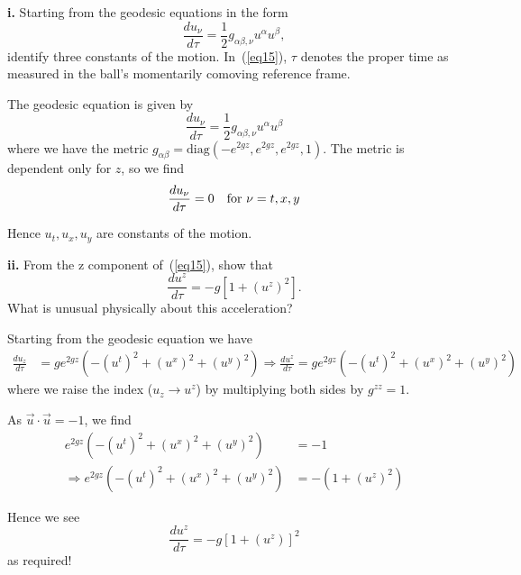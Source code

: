 \documentclass[a4paper]{article} %
\newcommand{\diag}{\text{diag}}
\begin{document}
\begin{framed}
\textbf{i.} Starting from the geodesic equations in the form
\begin{equation}
\frac{du_{\nu}}{d\tau}=\frac{1}{2}g_{\alpha\beta,\nu}u^{\alpha}u^{\beta},\label{eq15}
\end{equation}
identify three constants of the motion. In~(\ref{eq15}), $\tau$ denotes the proper time as measured in the ball's momentarily comoving reference frame.
\end{framed}

The geodesic equation is given by
\begin{equation}
\frac{du_{\nu}}{d\tau}=\frac{1}{2}g_{\alpha\beta,\nu}u^{\alpha}u^{\beta}
\end{equation}
where we have the metric $g_{\alpha\beta}=\diag(-e^{2gz},e^{2gz},e^{2gz},1)$. The metric is dependent only for $z$, so we find
\begin{equation}
\frac{du_{\nu}}{d\tau}=0\quad\text{for $\nu=t,x,y$}\\
\end{equation}

Hence $u_{t},u_{x},u_{y}$ are constants of the motion.


\begin{framed}
\textbf{ii.} From the z component of~(\ref{eq15}), show that
\begin{equation}
\frac{du^z}{d\tau}=-g[1+(u^z)^2].\label{eq16}
\end{equation}
What is unusual physically about this acceleration?
\end{framed}

Starting from the geodesic equation we have
\begin{align}
\frac{du_{z}}{d\tau}&=ge^{2gz}\left(-(u^t)^2+(u^x)^2+(u^y)^2\right)
\Rightarrow \frac{du^{z}}{d\tau}=ge^{2gz}\left(-(u^t)^2+(u^x)^2+(u^y)^2\right)
\end{align}
where we raise the index ($u_{z} \to u^{z}$) by multiplying both sides by $g^{zz}=1$.

As $\vec{u}\cdot\vec{u}=-1$, we find
\begin{align}
e^{2gz}\left(-(u^t)^2+(u^x)^2+(u^y)^2\right)&=-1\\
\Rightarrow e^{2gz}\left(-(u^t)^2+(u^x)^2+(u^y)^2\right)&=-\left(1+(u^z)^2\right)
\end{align}

Hence we see
\begin{equation}
\frac{du^z}{d\tau}=-g\left[1+(u^z)\right]^2
\end{equation}
as required!
\end{document}
